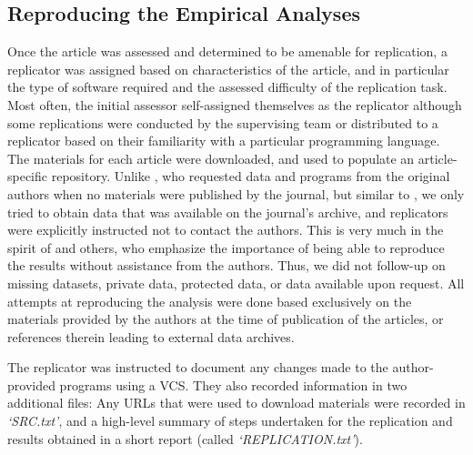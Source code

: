 \documentclass{cje} %
\theoremstyle{plain}%
\theoremstyle{definition}
\theoremstyle{remark}
\begin{document}
\begin{table}
\begin{minipage}{0.8\textwidth}
\end{minipage}

\end{table}


\FloatBarrier


\subsection{Reproducing the Empirical Analyses}

Once the article was assessed and determined to be amenable for replication, a replicator was assigned based on characteristics of the article, and in particular the type of software required and the assessed difficulty of the replication task. Most often, the initial assessor self-assigned themselves as the replicator although some replications were conducted by the supervising team or distributed to a replicator based on their familiarity with a particular programming language.
The materials for each article were downloaded, and used to populate an article-specific repository. 
%
%
Unlike  \cite{Dewald1986,McCullough03,Stodden2018}, who requested data and programs from the original authors when no materials were published by the journal, but similar to \cite{Glandon2010}, we only tried to obtain data that was available on the journal's archive, and replicators were explicitly instructed not to contact the authors. This is very much in the spirit of \cite{King95,McCullough2006,Glandon2010} and others, who emphasize the importance of being able to reproduce the results without assistance from the authors. Thus, we did not follow-up on  missing datasets, private data, protected data, or data available upon request. All attempts at reproducing the analysis were done based exclusively on the materials provided by the authors at the time of publication of the articles, or references therein leading to external data archives.
%

The replicator was instructed to document any changes made to the author-provided programs using a \ac{VCS}. They also recorded information in two additional files: Any URLs that were used to download materials were recorded in \textit{`SRC.txt'}, and a high-level summary of steps undertaken for the replication and results obtained in a short report (called \textit{`REPLICATION.txt'}).
\end{document}
